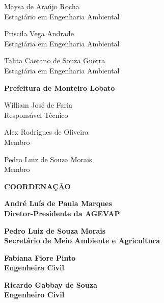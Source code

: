 \begin{flushleft}
	{Maysa de Araújo Rocha\\
	Estagiário em Engenharia Ambiental}\vspace{1em}	
	
	{Priscila Vega Andrade\\
	Estagiária em Engenharia Ambiental}\vspace{1em}
	
	{Talita Caetano de Souza Guerra\\
	Estagiária em Engenharia Ambiental}\vspace{1em}

	\textbf{Prefeitura de Monteiro Lobato}\vspace{1em}
	
	{William José de Faria\\
	Responsável Técnico}
	
	{Alex Rodrigues de Oliveira\\
	Membro}

	{Pedro Luiz de Souza Morais\\
	Membro}
\end{flushleft}
\vspace{\fill}

\begin{flushright}
{\bfseries\Large\flushleft\MakeUppercase{Coordenação}}\vspace{1.5em}

	\textbf{André Luís de Paula Marques\\
	Diretor-Presidente da AGEVAP}\vspace{1em}

\textbf{Pedro Luiz de Souza Morais\\
	Secretário de Meio Ambiente e Agricultura}\vspace{1em}

	\textbf{Fabiana Fiore Pinto\\
	Engenheira Civil}\vspace{1em}

\textbf{Ricardo Gabbay de Souza\\
	Engenheiro Civil}\vspace{1em}
\end{flushright}
\clearpage